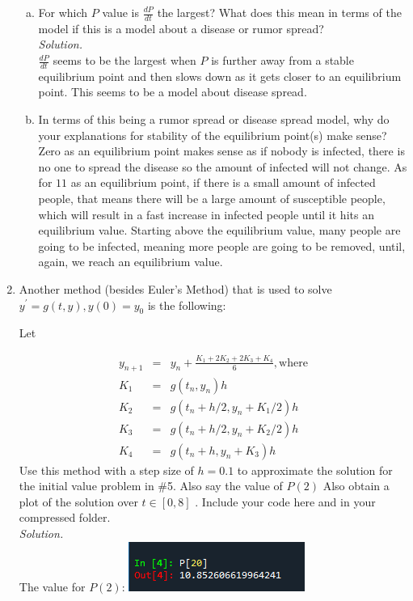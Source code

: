 \documentclass[12pt,letterpaper]{article}
\begin{document}
\begin{enumerate}
\begin{enumerate}[a)]
\item For which $P$ value is $\frac{dP}{dt}$ the largest?  What does this mean in terms of the model if this is a model about a disease or rumor spread?
\\
\emph{Solution.}\\
$\frac{dP}{dt}$ seems to be the largest when $P$ is further away from a stable equilibrium point
and then slows down as it gets closer to an equilibrium point. This seems to be 
a model about disease spread. 

\item In terms of this being a rumor spread or disease  spread model, why do your explanations for stability of the equilibrium point(s) make sense?
Zero as an equilibrium point makes sense as if nobody is infected, there is no one to 
spread the disease so the amount of infected will not change. As for $11$ as an equilibrium 
point, if there is a small amount of infected people, that means there will be a large 
amount of susceptible people, which will result in a fast increase in infected people
until it hits an equilibrium value. Starting above the equilibrium value, many people 
are going to be infected, meaning more people are going to be removed, until, again, 
we reach an equilibrium value. 
\end{enumerate}

\item Another method (besides Euler's Method) that is used to solve $y^{\prime}=g(t,y), y(0)=y_0$ is the following:  

Let 

\begin{eqnarray*}
y_{n+1}&=&y_n+\frac{K_1+2K_2+2K_3+K_4}{6}, \mbox{where} \\
K_1&=&g(t_n,y_n)h\\
K_2&=&g(t_n+h/2,y_n+K_1/2)h\\
K_3&=&g(t_n+h/2,y_n+K_2/2)h\\
K_4&=&g(t_n+h,y_n+K_3)h
\end{eqnarray*}
Use this method with a step size of  $h=0.1$ to approximate the solution for the initial value problem in \#5.   Also say the value of $P(2)$  Also obtain  a  plot of the solution over $t \in [0,8]$ . Include your code here and in your compressed folder.
\\
\emph{Solution.} \\
The value for $P(2)$: 
\includegraphics{p2.png}\\


\end{enumerate}
\end{document}
